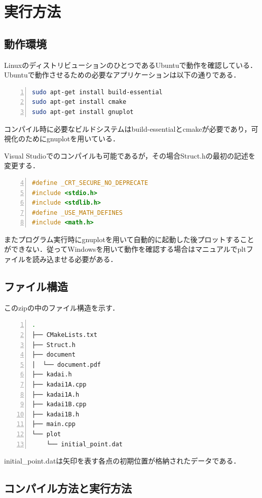 \documentclass[a4paper,10pt]{jsarticle}
\begin{document}
\section{実行方法}
\subsection{動作環境}
LinuxのディストリビューションのひとつであるUbuntuで動作を確認している．
Ubuntuで動作させるための必要なアプリケーションは以下の通りである．

\begin{lstlisting}[basicstyle=\ttfamily\footnotesize, language=Bash, frame=single, firstnumber=1, numbers=left, breaklines=true]
sudo apt-get install build-essential
sudo apt-get install cmake
sudo apt-get install gnuplot
\end{lstlisting}

コンパイル時に必要なビルドシステムはbuild-essentialとcmakeが必要であり，可視化のためにgnuplotを用いている．

Visual Studioでのコンパイルも可能であるが，その場合Struct.hの最初の記述を変更する．

\begin{lstlisting}[basicstyle=\ttfamily\footnotesize, language=C, frame=single, firstnumber=4, numbers=left, breaklines=true]
#define _CRT_SECURE_NO_DEPRECATE
#include <stdio.h>
#include <stdlib.h>
#define _USE_MATH_DEFINES
#include <math.h>
\end{lstlisting}

またプログラム実行時にgnuplotを用いて自動的に起動した後プロットすることができない．従ってWindowsを用いて動作を確認する場合はマニュアルでpltファイルを読み込ませる必要がある．

\subsection{ファイル構造}
このzipの中のファイル構造を示す．

\begin{lstlisting}[basicstyle=\ttfamily\footnotesize, language=Bash, frame=single, firstnumber=1, numbers=left, breaklines=true]
.
├── CMakeLists.txt
├── Struct.h
├── document
│  └── document.pdf
├── kadai.h
├── kadai1A.cpp
├── kadai1A.h
├── kadai1B.cpp
├── kadai1B.h
├── main.cpp
└── plot
    └── initial_point.dat
\end{lstlisting}

initial\_point.datは矢印を表す各点の初期位置が格納されたデータである．

\subsection{コンパイル方法と実行方法}
\end{document}
